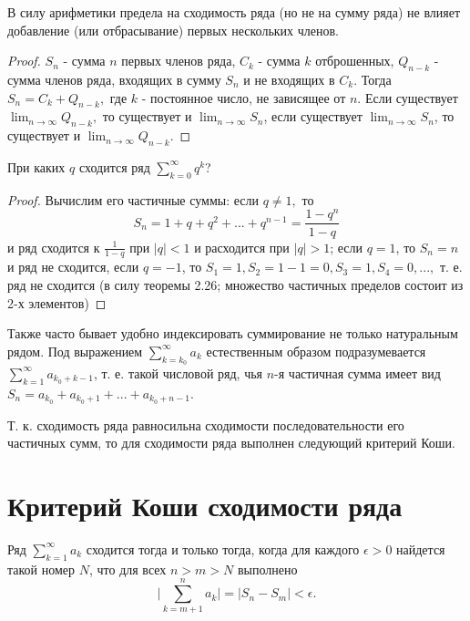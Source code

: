 	В силу арифметики предела на сходимость ряда (но не на сумму ряда) не влияет добавление (или отбрасывание) первых нескольких членов.
	\begin{proof}
		$S_n$ - сумма $n$ первых членов ряда, $C_k$ - сумма $k$ отброшенных, $Q_{n - k}$ - сумма членов ряда, входящих в сумму $S_n$ и не входящих в $C_k$. Тогда $S_n = C_k + Q_{n - k},$ где $k$ - постоянное число, не зависящее от $n$. Если существует $\lim_{n \to \infty} Q_{n - k},$ то существует и $\lim_{n \to \infty} S_n$, если существует $\lim_{n \to \infty} S_n$, то  существует и $\lim_{n \to \infty} Q_{n - k}$.
	\end{proof}
	
	\begin{example}
		При каких $q$ сходится ряд $\sum^{\infty}_{k = 0} q^k$?
	\end{example}
	
	\begin{proof}
		Вычислим его частичные суммы: если $q \neq 1,$ то
		\[ S_n = 1 + q + q^2 + ... + q^{n - 1} = \frac{1 - q^n}{1 - q} \]
		и ряд сходится к $\frac{1}{1 - q}$ при $|q| < 1$ и расходится при $|q| > 1$; если $q = 1$, то $S_n = n$ и ряд не сходится, если $q = -1$, то $S_1 = 1, S_2 = 1 - 1 = 0, S_3 = 1, S_4 = 0, ...,$ т. е. ряд не сходится (в силу теоремы 2.26; множество частичных пределов состоит из 2-х элементов)
	\end{proof}
	
	Также часто бывает удобно индексировать суммирование не только натуральным рядом. Под выражением $\sum_{k = k_0}^{\infty} a_k$ естественным образом подразумевается $\sum_{k = 1}^{\infty} a_{k_0 + k - 1}$, т. е. такой числовой ряд, чья $n$-я частичная сумма имеет вид $S_n = a_{k_0} + a_{k_0 + 1} + ... + a_{k_0 + n - 1}$.
	
	Т. к. сходимость ряда равносильна сходимости последовательности его частичных сумм, то для сходимости ряда выполнен следующий критерий Коши.
	
	\section{Критерий Коши сходимости ряда}
	
	\begin{theorem}
		Ряд $\sum^{\infty}_{k = 1} a_k$ сходится тогда и только тогда, когда для каждого $\epsilon > 0$ найдется такой номер $N$, что для всех $n > m > N$
		выполнено
		\[ \bigg|\sum^n_{k = m + 1} a_k\bigg| = |S_n - S_m| < \epsilon. \]
	\end{theorem}
	
